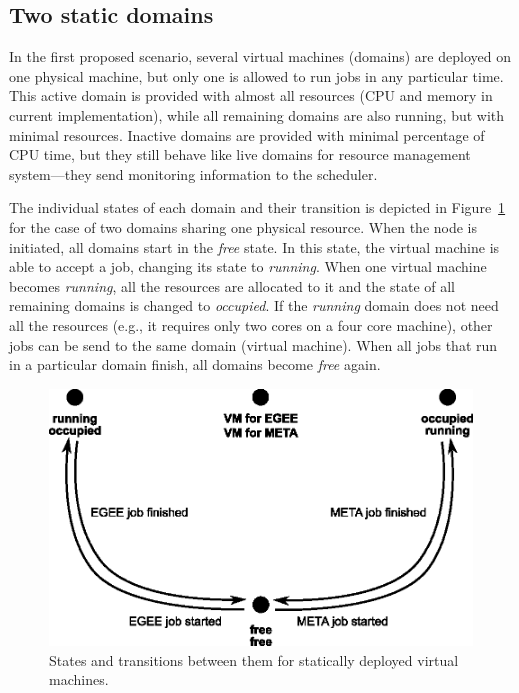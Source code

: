 \documentclass{sig-alternate}
\begin{document}
\subsection{Two static domains}

In the first proposed scenario, several virtual machines (domains) are deployed on one physical machine, but only one is allowed 
to run jobs in any particular time. This active domain is provided with almost all resources 
(CPU and memory in current implementation), while all remaining domains are also running, but with minimal resources. 
Inactive domains are provided with minimal 
percentage of CPU time, but they still behave like live domains for
resource management system---they send monitoring information to the
scheduler.

The individual states of each domain and their transition is depicted in
Figure~\ref{fig:twoVMs} for the case of two domains sharing one physical
resource. When the node is initiated, all domains start in the
\emph{free} state. In this state, the virtual machine is able to accept
a job, changing its state to \emph{running}. When one virtual machine
becomes \emph{running}, all the resources are allocated to it and the
state of all remaining domains is changed to \emph{occupied}. If the
\emph{running} domain does not need all the resources (e.g., it requires
only two cores on a four core machine), other jobs can be send to the same
domain (virtual machine). When all jobs that run in a particular domain
finish, all domains become \textit{free} again.

\begin{figure}[tb]
    \includegraphics[width=\columnwidth]{twoVMs}
    \caption{States and transitions between them for statically deployed
        virtual machines.}
    \label{fig:twoVMs}
\end{figure}
\end{document}
